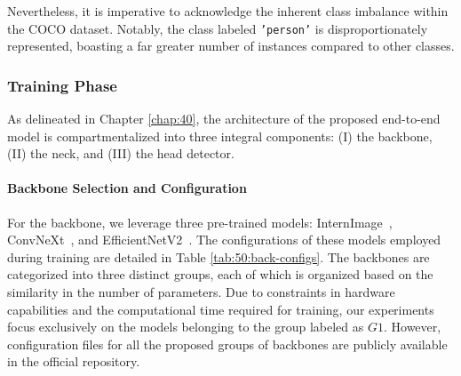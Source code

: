 Nevertheless, it is imperative to acknowledge the inherent class imbalance within the COCO dataset. Notably, the class labeled \texttt{'person'} is disproportionately represented, boasting a far greater number of instances compared to other classes. 

\subsubsection{Training Phase} \label{subsubsec:40:train}

As delineated in Chapter \ref{chap:40}, the architecture of the proposed end-to-end model is compartmentalized into three integral components: (I) the backbone, (II) the neck, and (III) the head detector.

\paragraph{Backbone Selection and Configuration}

For the backbone, we leverage three pre-trained models: InternImage~\cite{wang2023internimage}, ConvNeXt~\cite{liu2022convnet}, and EfficientNetV2~\cite{tan2021efficientnetv2}. The configurations of these models employed during training are detailed in Table \ref{tab:50:back-configs}. The backbones are categorized into three distinct groups, each of which is organized based on the similarity in the number of parameters. Due to constraints in hardware capabilities and the computational time required for training, our experiments focus exclusively on the models belonging to the group labeled as \(G1\). However, configuration files for all the proposed groups of backbones are publicly available in the official repository.

